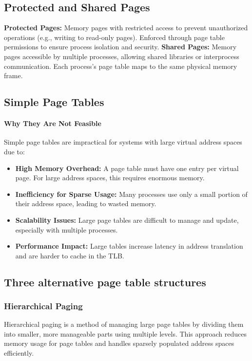 \documentclass{article}
\begin{document}
\subsection{Protected and Shared Pages}

{\bf Protected Pages: } Memory pages with restricted access to prevent unauthorized operations (e.g., writing to read-only pages). Enforced through page table permissions to ensure process isolation and security.
\newline
\newline
{\bf Shared Pages: } Memory pages accessible by multiple processes, allowing shared libraries or interprocess communication. Each process's page table maps to the same physical memory frame.

\subsection{Simple Page Tables}

\paragraph{Why They Are Not Feasible}
Simple page tables are impractical for systems with large virtual address spaces due to:

\begin{itemize}
    \item \textbf{High Memory Overhead:} A page table must have one entry per virtual page. For large address spaces, this requires enormous memory.
    \item \textbf{Inefficiency for Sparse Usage:} Many processes use only a small portion of their address space, leading to wasted memory.
    \item \textbf{Scalability Issues:} Large page tables are difficult to manage and update, especially with multiple processes.
    \item \textbf{Performance Impact:} Large tables increase latency in address translation and are harder to cache in the TLB.
\end{itemize}

\subsection{Three alternative page table structures}

\subsubsection{Hierarchical Paging}
Hierarchical paging is a method of managing large page tables by dividing them into smaller, more manageable parts using multiple levels. This approach reduces memory usage for page tables and handles sparsely populated address spaces efficiently.
\end{document}
